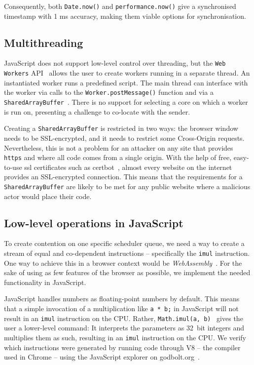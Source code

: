 \documentclass[11pt,
  titlepage=false,
  parskip=half,      %
]{scrreprt}
\begin{document}
Consequently, both \texttt{Date.now()} and \texttt{performance.now()} give a synchronised timestamp with 1 ms accuracy, making them viable options for synchronisation.

\subsection{Multithreading}\label{subsec:multithreading}
JavaScript does not support low-level control over threading, but the \texttt{Web Workers} API~\cite{webworkers} allows the user to create workers running in a separate thread.
An instantiated worker runs a predefined script.
The main thread can interface with the worker via calls to the \texttt{Worker.postMessage()} function and via a \texttt{SharedArrayBuffer}~\cite{sharedarraybuffer}.
There is no support for selecting a core on which a worker is run on, presenting a challenge to co-locate with the sender.

Creating a \texttt{SharedArrayBuffer} is restricted in two ways: the browser window needs to be SSL-encrypted, and it needs to restrict some Cross-Origin requests.
Nevertheless, this is not a problem for an attacker on any site that provides \texttt{https} and where all code comes from a single origin.
With the help of free, easy-to-use ssl certificates such as certbot~\cite{certbot}, almost every website on the internet provides an SSL-encrypted connection.
This means that the requirements for a \texttt{SharedArrayBuffer} are likely to be met for any public website where a malicious actor would place their code.

\subsection{Low-level operations in JavaScript}\label{subsec:lowleveljs}
To create contention on one specific scheduler queue, we need a way to create a stream of equal and co-dependent instructions -- specifically the \texttt{imul} instruction.
One way to achieve this in a browser context would be \textit{WebAssembly}~\cite{webassembly}.
For the sake of using as few features of the browser as possible, we implement the needed functionality in JavaScript.

JavaScript handles numbers as floating-point numbers by default.
This means that a simple invocation of a multiplication like \texttt{a * b;} in JavaScript will not result in an \texttt{imul} instruction on the CPU.
Rather, \texttt{Math.imul(a, b)}~\cite{mathimul} gives the user a lower-level command:
It interprets the parameters as 32~bit integers and multiplies them as such, resulting in an \texttt{imul} instruction on the CPU.
We verify which instructions were generated by running code through V8 -- the compiler used in Chrome --
using the JavaScript explorer on godbolt.org~\cite{godbolt}.
\end{document}
